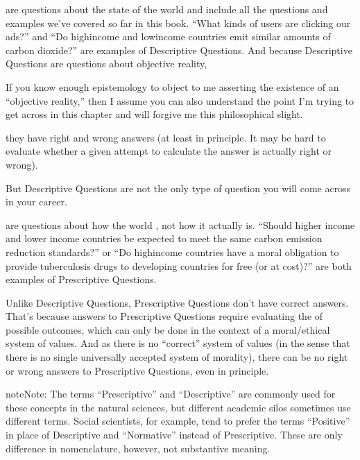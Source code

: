 \documentclass[letterpaper,10pt,english]{jupyterBook}
\begin{document}
\sphinxAtStartPar
{} are questions about the state of the world and include all the questions and examples we’ve covered so far in this book. “What kinds of users are clicking our ads?” and “Do high\sphinxhyphen{}income and low\sphinxhyphen{}income countries emit similar amounts of carbon dioxide?” are examples of Descriptive Questions. And because Descriptive Questions are questions about objective reality,%
\begin{footnote}[1]\sphinxAtStartFootnote
If you know enough epistemology to object to me asserting the existence of an “objective reality,” then I assume you can also understand the point I’m trying to get across in this chapter and will forgive me this philosophical slight.
%
\end{footnote} they have right and wrong answers (at least in principle. It may be hard to evaluate whether a given attempt to calculate the answer is actually right or wrong).

\sphinxAtStartPar
But Descriptive Questions are not the only type of question you will come across in your career.

\sphinxAtStartPar
{} are questions about how the world , not how it actually is. “Should higher income and lower income countries be expected to meet the same carbon emission reduction standards?” or “Do high\sphinxhyphen{}income countries have a moral obligation to provide tuberculosis drugs to developing countries for free (or at cost)?” are both examples of Prescriptive Questions.

\sphinxAtStartPar
Unlike Descriptive Questions, Prescriptive Questions don’t have correct answers. That’s because answers to Prescriptive Questions require evaluating the  of possible outcomes, which can only be done in the context of a moral/ethical system of values. And as there is no “correct” system of values (in the sense that there is no single universally accepted system of morality), there can be no right or wrong answers to Prescriptive Questions, even in principle.

\sphinxAtStartPar
{}

\begin{sphinxadmonition}{note}{Note:}
\sphinxAtStartPar
The terms “Prescriptive” and “Descriptive” are commonly used for these concepts in the natural sciences, but different academic silos sometimes use different terms. Social scientists, for example, tend to prefer the terms “Positive” in place of Descriptive and “Normative” instead of Prescriptive. These are only difference in nomenclature, however, not substantive meaning.
\end{sphinxadmonition}
\end{document}
